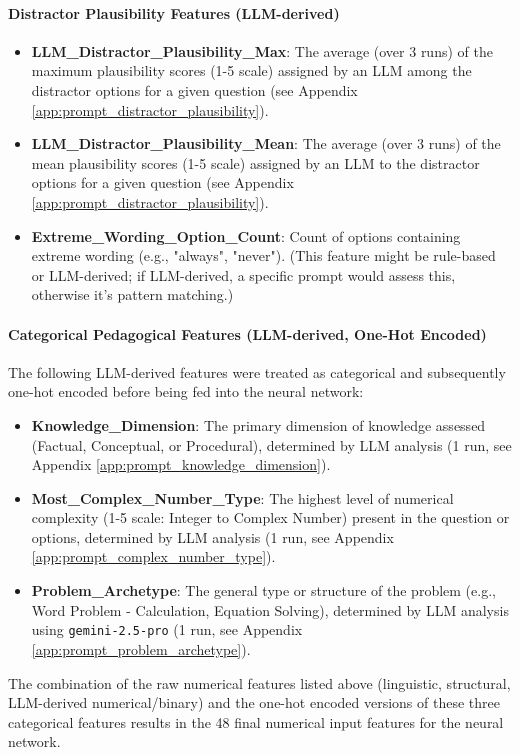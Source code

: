 \documentclass[
    a4paper, %
    10pt, %
    twoside, %
]{LTJournalArticle}
\begin{document}
\paragraph{Distractor Plausibility Features (LLM-derived)}
\begin{itemize}
    \item \textbf{LLM\_Distractor\_Plausibility\_Max}: The average (over 3 runs) of the maximum plausibility scores (1-5 scale) assigned by an LLM among the distractor options for a given question (see Appendix \ref{app:prompt_distractor_plausibility}).
    \item \textbf{LLM\_Distractor\_Plausibility\_Mean}: The average (over 3 runs) of the mean plausibility scores (1-5 scale) assigned by an LLM to the distractor options for a given question (see Appendix \ref{app:prompt_distractor_plausibility}).
    \item \textbf{Extreme\_Wording\_Option\_Count}: Count of options containing extreme wording (e.g., "always", "never"). (This feature might be rule-based or LLM-derived; if LLM-derived, a specific prompt would assess this, otherwise it's pattern matching.)
\end{itemize}

\paragraph{Categorical Pedagogical Features (LLM-derived, One-Hot Encoded)}
The following LLM-derived features were treated as categorical and subsequently one-hot encoded before being fed into the neural network:
\begin{itemize}
    \item \textbf{Knowledge\_Dimension}: The primary dimension of knowledge assessed (Factual, Conceptual, or Procedural), determined by LLM analysis (1 run, see Appendix \ref{app:prompt_knowledge_dimension}).
    \item \textbf{Most\_Complex\_Number\_Type}: The highest level of numerical complexity (1-5 scale: Integer to Complex Number) present in the question or options, determined by LLM analysis (1 run, see Appendix \ref{app:prompt_complex_number_type}).
    \item \textbf{Problem\_Archetype}: The general type or structure of the problem (e.g., Word Problem - Calculation, Equation Solving), determined by LLM analysis using \texttt{gemini-2.5-pro} (1 run, see Appendix \ref{app:prompt_problem_archetype}).
\end{itemize}
The combination of the raw numerical features listed above (linguistic, structural, LLM-derived numerical/binary) and the one-hot encoded versions of these three categorical features results in the 48 final numerical input features for the neural network.
\end{document}
